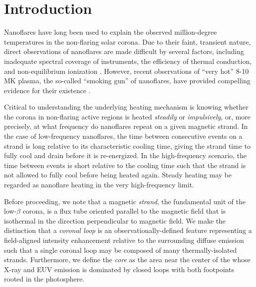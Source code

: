 \section{Introduction}\label{introduction}

Nanoflares have long been used to explain the observed million-degree temperatures in the non-flaring solar corona.  Due to their faint, transient nature, direct observations of nanoflares are made difficult by several factors, including inadequate spectral coverage of instruments, the efficiency of thermal conduction, and non-equilibrium ionization \citep{cargill_implications_1994,winebarger_defining_2012,barnes_inference_2016}. However, recent observations of ``very hot'' 8-10 MK plasma, the so-called ``smoking gun'' of nanoflares, have provided compelling evidence for their existence \citep[e.g.][]{brosius_pervasive_2014,caspi_new_2015,parenti_spectroscopy_2017,ishikawa_detection_2017}.

Critical to understanding the underlying heating mechanism is knowing whether the corona in non-flaring active regions is heated \textit{steadily} or \textit{impulsively}, or, more precisely, at what frequency do nanoflares repeat on a given magnetic strand. In the case of low-frequency nanoflares, the time between consecutive events on a strand is long relative to its characteristic cooling time, giving the strand time to fully cool and drain before it is re-energized. In the high-frequency scenario, the time between events is short relative to the cooling time such that the strand is not allowed to fully cool before being heated again. Steady heating may be regarded as nanoflare heating in the very high-frequency limit. 

Before proceeding, we note that a magnetic \textit{strand}, the fundamental unit of the low-$\beta$ corona, is a flux tube oriented parallel to the magnetic field that is isothermal in the direction perpendicular to magnetic field. We make the distinction that a \textit{coronal loop} is an observationally-defined feature representing a field-aligned intensity enhancement relative to the surrounding diffuse emission such that a single coronal loop may be composed of many thermally-isolated strands. Furthermore, we define the \AR{} \textit{core} as the area near the center of the \AR{} whose X-ray and EUV emission is dominated by closed loops with both footpoints rooted in the photosphere.

